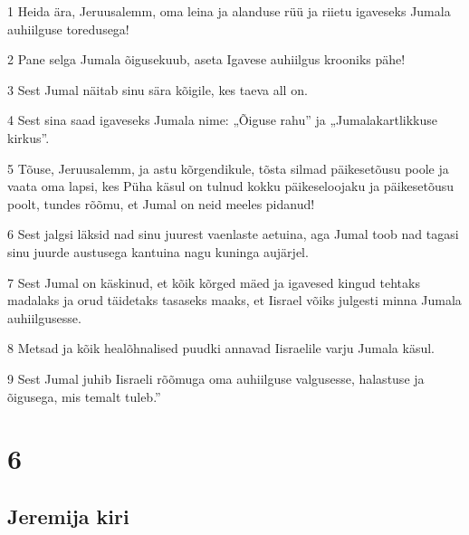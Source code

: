 \par 1 Heida ära, Jeruusalemm, oma leina ja alanduse rüü ja riietu igaveseks Jumala auhiilguse toredusega!
\par 2 Pane selga Jumala õigusekuub, aseta Igavese auhiilgus krooniks pähe!
\par 3 Sest Jumal näitab sinu sära kõigile, kes taeva all on.
\par 4 Sest sina saad igaveseks Jumala nime: „Õiguse rahu” ja „Jumalakartlikkuse kirkus”.
\par 5 Tõuse, Jeruusalemm, ja astu kõrgendikule, tõsta silmad päikesetõusu poole ja vaata oma lapsi, kes Püha käsul on tulnud kokku päikeseloojaku ja päikesetõusu poolt, tundes rõõmu, et Jumal on neid meeles pidanud!
\par 6 Sest jalgsi läksid nad sinu juurest vaenlaste aetuina, aga Jumal toob nad tagasi sinu juurde austusega kantuina nagu kuninga aujärjel.
\par 7 Sest Jumal on käskinud, et kõik kõrged mäed ja igavesed kingud tehtaks madalaks ja orud täidetaks tasaseks maaks, et Iisrael võiks julgesti minna Jumala auhiilgusesse.
\par 8 Metsad ja kõik healõhnalised puudki annavad Iisraelile varju Jumala käsul.
\par 9 Sest Jumal juhib Iisraeli rõõmuga oma auhiilguse valgusesse, halastuse ja õigusega, mis temalt tuleb.”

\chapter{6}

\section*{Jeremija kiri}

